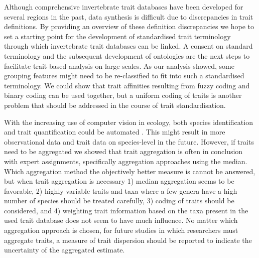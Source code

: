 \documentclass{article}
\begin{document}
Although comprehensive invertebrate trait databases have been developed for several regions in the past, data synthesis is difficult due to discrepancies in trait definitions. By providing an overview of these definition discrepancies we hope to set a starting point for the development of standardised trait terminology through which invertebrate trait databases can be linked. A consent on standard terminology and the subsequent development of ontologies are the next steps to facilitate trait-based analysis on large scales. As our analysis showed, some grouping features might need to be re-classified to fit into such a standardised terminology. We could show that trait affinities resulting from fuzzy coding and binary coding can be used together, but a uniform coding of traits is another problem that should be addressed in the course of trait standardisation.  

With the increasing use of computer vision in ecology, both species identification and trait quantification could be automated \cite{milosevic_application_2020, hoye_deep_2020}. This might result in more observational data and trait data on species-level in the future. However, if traits need to be aggregated we showed that trait aggregation is often in conclusion with expert assignments, specifically aggregation approaches using the median. Which aggregation method the objectively better measure is cannot be answered, but when trait aggregation is necessary 1) median aggregation seems to be favorable, 2) highly variable traits and taxa where a few genera have a high number of species should be treated carefully, 3) coding of traits should be considered, and 4) weighting trait information based on the taxa present in the used trait database does not seem to have much influence. No matter which aggregation approach is chosen, for future studies in which researchers must aggregate traits, a measure of trait dispersion should be reported to indicate the uncertainty of the aggregated estimate. 
\end{document}
